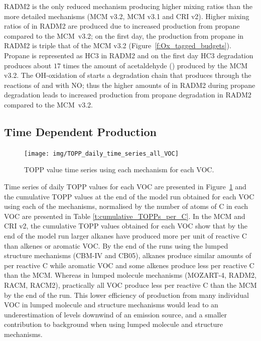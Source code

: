 RADM2 is the only reduced mechanism producing higher  mixing ratios than the more detailed mechanisms (MCM v3.2, MCM v3.1 and CRI v2).
Higher mixing ratios of  in RADM2 are produced due to increased  production from propane compared to the \mbox{MCM v3.2}; on the first day, the  production from propane in RADM2 is triple that of the MCM v3.2 \mbox{(Figure \ref{f:Ox_tagged_budgets})}.
Propane is represented as HC3 in RADM2 \citep{Stockwell:1990} and on the first day HC3 degradation produces about $17$ times the amount of acetaldehyde () produced by the MCM v3.2.
The OH-oxidation of  starts a degradation chain that produces  through the reactions of  and  with NO; thus the higher amounts of  in RADM2 during propane degradation leads to increased  production from propane degradation in RADM2 compared to the \mbox{MCM v3.2}.
%
\subsection[Time Dependent Ox Production]{Time Dependent  Production}
%
\begin{figure}
    \centering
    \caption{TOPP value time series using each mechanism for each VOC.}
    \texttt{[image: img/TOPP\_daily\_time\_series\_all\_VOC]}
    \vspace{-2mm}
    \label{f:TOPP_dailies}
\end{figure}
%

Time series of daily TOPP values for each VOC are presented in \mbox{Figure \ref{f:TOPP_dailies}} and the cumulative TOPP values at the end of the model run obtained for each VOC using each of the mechanisms, normalised by the number of atoms of C in each VOC are presented in Table \ref{t:cumulative_TOPPs_per_C}.
In the MCM and CRI v2, the cumulative TOPP values obtained for each VOC show that by the end of the model run larger alkanes have produced more  per unit of reactive C than alkenes or aromatic VOC.
By the end of the runs using the lumped structure mechanisms (CBM-IV and CB05), alkanes produce similar amounts of  per reactive C while aromatic VOC and some alkenes produce less  per reactive C than the MCM.
Whereas in lumped molecule mechanisms (MOZART-4, RADM2, RACM, RACM2), practically all VOC produce less  per reactive C than the MCM by the end of the run.
This lower efficiency of  production from many individual VOC in lumped molecule and structure mechanisms would lead to an underestimation of  levels downwind of an emission source, and a smaller contribution to background  when using lumped molecule and structure mechanisms.


